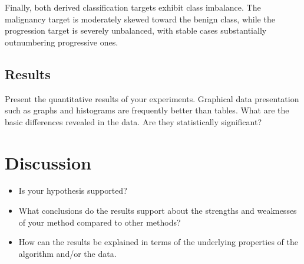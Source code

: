 Finally, both derived classification targets exhibit class imbalance. The malignancy target is moderately skewed toward the benign class, while the progression target is severely unbalanced, with stable cases substantially outnumbering progressive ones. 





\subsection{Results}
\label{section:results}

Present the quantitative results of your experiments. Graphical data presentation such as graphs and histograms are frequently better than tables. What are the basic differences revealed in the data. Are they statistically significant?

\section{Discussion}
\label{section:discussion}

\begin{itemize}
	\item Is your hypothesis supported? 
	\item What conclusions do the results support about the strengths and weaknesses of your method compared to other methods? 
	\item How can the results be explained in terms of the underlying properties of the algorithm and/or the data. 
\end{itemize}